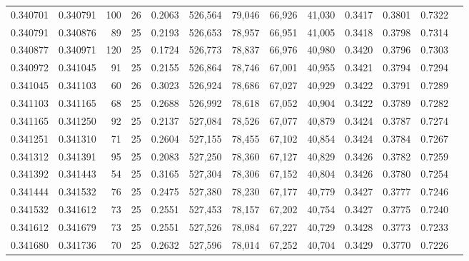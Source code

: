 \begin{tabular}{rrrrrrrrrrrrr}
0.340701 & 0.340791 &   100 &  26 &                                     0.2063 & 526,564 &  79,046 &  66,926 &  41,030 & 0.3417 & 0.3801 & 0.7322 \\
0.340791 & 0.340876 &    89 &  25 &                                     0.2193 & 526,653 &  78,957 &  66,951 &  41,005 & 0.3418 & 0.3798 & 0.7314 \\
0.340877 & 0.340971 &   120 &  25 &                                     0.1724 & 526,773 &  78,837 &  66,976 &  40,980 & 0.3420 & 0.3796 & 0.7303 \\
0.340972 & 0.341045 &    91 &  25 &                                     0.2155 & 526,864 &  78,746 &  67,001 &  40,955 & 0.3421 & 0.3794 & 0.7294 \\
0.341045 & 0.341103 &    60 &  26 &                                     0.3023 & 526,924 &  78,686 &  67,027 &  40,929 & 0.3422 & 0.3791 & 0.7289 \\
0.341103 & 0.341165 &    68 &  25 &                                     0.2688 & 526,992 &  78,618 &  67,052 &  40,904 & 0.3422 & 0.3789 & 0.7282 \\
0.341165 & 0.341250 &    92 &  25 &                                     0.2137 & 527,084 &  78,526 &  67,077 &  40,879 & 0.3424 & 0.3787 & 0.7274 \\
0.341251 & 0.341310 &    71 &  25 &                                     0.2604 & 527,155 &  78,455 &  67,102 &  40,854 & 0.3424 & 0.3784 & 0.7267 \\
0.341312 & 0.341391 &    95 &  25 &                                     0.2083 & 527,250 &  78,360 &  67,127 &  40,829 & 0.3426 & 0.3782 & 0.7259 \\
0.341392 & 0.341443 &    54 &  25 &                                     0.3165 & 527,304 &  78,306 &  67,152 &  40,804 & 0.3426 & 0.3780 & 0.7254 \\
0.341444 & 0.341532 &    76 &  25 &                                     0.2475 & 527,380 &  78,230 &  67,177 &  40,779 & 0.3427 & 0.3777 & 0.7246 \\
0.341532 & 0.341612 &    73 &  25 &                                     0.2551 & 527,453 &  78,157 &  67,202 &  40,754 & 0.3427 & 0.3775 & 0.7240 \\
0.341612 & 0.341679 &    73 &  25 &                                     0.2551 & 527,526 &  78,084 &  67,227 &  40,729 & 0.3428 & 0.3773 & 0.7233 \\
0.341680 & 0.341736 &    70 &  25 &                                     0.2632 & 527,596 &  78,014 &  67,252 &  40,704 & 0.3429 & 0.3770 & 0.7226 \\

\end{tabular}
